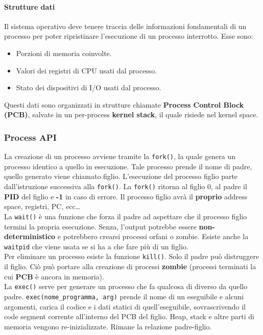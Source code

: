 \documentclass[12pt, twoside, letterpaper]{article}
\begin{document}
				\paragraph{Strutture dati} Il sistema operativo deve tenere traccia delle informazioni fondamentali di un processo per poter ripristinare l'esecuzione di un processo interrotto. Esse sono: 
					\begin{itemize}
						\item Porzioni di memoria coinvolte.
						\item Valori dei registri di CPU usati dal processo.
						\item Stato dei dispositivi di I/O usati dal processo.
					\end{itemize}
					Questi dati sono organizzati in strutture chiamate \textbf{Process Control Block (PCB)}, salvate in un per-process \textbf{kernel stack}, il quale risiede nel kernel space.
					
			\subsubsection{Process API}
				
				La creazione di un processo avviene tramite la \texttt{fork()}, la quale genera un processo identico a quello in esecuzione. Tale processo prende il nome di padre, quello generato viene chiamato figlio. L'esecuzione del processo figlio parte dall'istruzione successiva alla \texttt{fork()}. La \texttt{fork()} ritorna al figlio 0, al padre il \textbf{PID} del figlio e \textbf{-1} in caso di errore. Il processo figlio avrà il \textbf{proprio} address space, registri, PC, ecc\dots   \\
				
				La \texttt{wait()} è una funzione che forza il padre ad aspettare che il processo figlio termini la propria esecuzione. Senza, l'output potrebbe essere \textbf{non-deterministico} e potrebbero crearsi processi orfani o zombie. Esiste anche la \texttt{waitpid} che viene usata se si ha a che fare più di un figlio.\\
				
				Per eliminare un processo esiste la funzione \texttt{kill()}. Solo il padre può distruggere il figlio. Ciò può portare alla creazione di processi \textbf{zombie} (processi terminati la cui \textbf{PCB} è ancora in memoria). \\
				
				La \texttt{exec()} serve per generare un processo che fa qualcosa di diverso da quello padre. \texttt{exec(nome\_programma, arg)} prende il nome di un eseguibile e alcuni argomenti, carica il codice e i dati statici di quell'eseguibile, sovrascrivendo il code segment corrente all'interno del PCB del figlio. Heap, stack e altre parti di memoria vengono re-inizializzate. Rimane la relazione padre-figlio.
				
\end{document}
